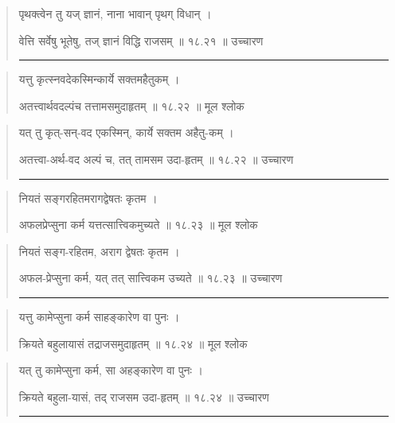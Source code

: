 \begin{quotation}

पृथक्त्वेन तु यज् ज्ञानं, नाना भावान् पृथग् विधान्‌  ।  

वेत्ति सर्वेषु भूतेषु, तज् ज्ञानं विद्धि राजसम्‌  ॥ १८.२१ ॥  उच्चारण

\noindent\rule{16cm}{0.4pt} 
\end{quotation}


\begin{quotation}

यत्तु कृत्स्नवदेकस्मिन्कार्ये सक्तमहैतुकम्‌ ।  

अतत्त्वार्थवदल्पंच तत्तामसमुदाहृतम्‌  ॥ १८.२२ ॥  मूल श्लोक
\end{quotation}

\begin{quotation}

यत् तु कृत्-सन्-वद एकस्मिन्, कार्ये सक्तम अहैतु-कम्‌ ।  

अतत्त्वा-अर्थ-वद अल्पं च, तत् तामसम उदा-हृतम्‌  ॥ १८.२२ ॥  उच्चारण

\noindent\rule{16cm}{0.4pt} 
\end{quotation}


\begin{quotation}

नियतं सङ्‍गरहितमरागद्वेषतः कृतम ।  

अफलप्रेप्सुना कर्म यत्तत्सात्त्विकमुच्यते  ॥ १८.२३ ॥  मूल श्लोक
\end{quotation}

\begin{quotation}
नियतं सङ्‍ग-रहितम, अराग द्वेषतः कृतम ।  

अफल-प्रेप्सुना कर्म, यत् तत् सात्त्विकम उच्यते  ॥ १८.२३ ॥  उच्चारण

\noindent\rule{16cm}{0.4pt} 
\end{quotation}


\begin{quotation}

यत्तु कामेप्सुना कर्म साहङ्‍कारेण वा पुनः ।  

क्रियते बहुलायासं तद्राजसमुदाहृतम्‌  ॥ १८.२४ ॥  मूल श्लोक
\end{quotation}

\begin{quotation}

यत् तु कामेप्सुना कर्म, सा अहङ्‍कारेण वा पुनः ।  

क्रियते बहुला-यासं, तद् राजसम उदा-हृतम्‌  ॥ १८.२४ ॥  उच्चारण

\noindent\rule{16cm}{0.4pt} 
\end{quotation}


